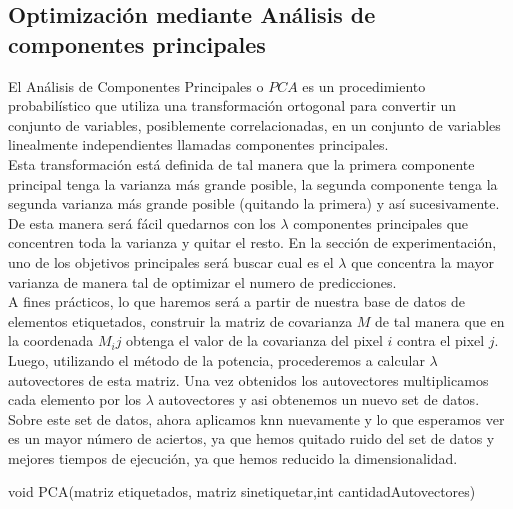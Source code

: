 \subsection{Optimización mediante Análisis de componentes principales}
El Análisis de Componentes Principales o $PCA$ es un procedimiento probabilístico que utiliza una transformación ortogonal para convertir un conjunto de variables, posiblemente correlacionadas, en un conjunto de variables linealmente independientes llamadas componentes principales.
\\
Esta transformación está definida de tal manera que la primera componente principal tenga la varianza más grande posible, la segunda componente tenga la segunda varianza más grande posible (quitando la primera) y así sucesivamente.
\\
De esta manera será fácil quedarnos con los $\lambda$ componentes principales que concentren toda la varianza y quitar el resto. En la sección de experimentación, uno de los objetivos principales será buscar cual es el $\lambda$ que concentra la mayor varianza de manera tal de optimizar el numero de predicciones. 
\\
A fines prácticos, lo que haremos será a partir de nuestra base de datos de elementos etiquetados, construir la matriz de covarianza $M$ de tal manera que en la coordenada $M_ij$ obtenga el valor de la covarianza del pixel $i$ contra el pixel $j$.
\\
Luego, utilizando el método de la potencia, procederemos a calcular $\lambda$ autovectores de esta matriz. Una vez obtenidos los autovectores multiplicamos cada elemento por los $\lambda$ autovectores y asi obtenemos un nuevo set de datos.
\\
Sobre este set de datos, ahora aplicamos knn nuevamente y lo que esperamos ver es un mayor número de aciertos, ya que hemos quitado ruido del set de datos y mejores tiempos de ejecución, ya que hemos reducido la dimensionalidad.
\\

\begin{algorithm}
\begin{algorithmic}[1]\parskip=1mm
\caption{void PCA(matriz etiquetados, matriz sinetiquetar,int cantidadAutovectores)}
\ENDFOR\\
\end{algorithmic}
\end{algorithm}
\\

